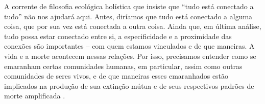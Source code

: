 \begin{citacaoabnt}
A corrente de filosofia ecológica holística que insiste que ``tudo está conectado a tudo'' não nos ajudará aqui. Antes, diríamos que tudo está conectado a alguma coisa, que por sua vez está conectada a outra coisa. Ainda que, em última análise, tudo possa estar conectado entre si, a especificidade e a proximidade das conexões são importantes -- com quem estamos vinculados e de que maneiras. A vida e a morte acontecem nessas relações. Por isso, precisamos entender como se emaranham certas comunidades humanas, em particular, assim como outras comunidades de seres vivos, e de que maneiras esses emaranhados estão implicados na produção de sua extinção mútua e de seus respectivos padrões de morte amplificada \parencite[p.~60, n.~4]{Haraway2023Ficar}.
\end{citacaoabnt}

